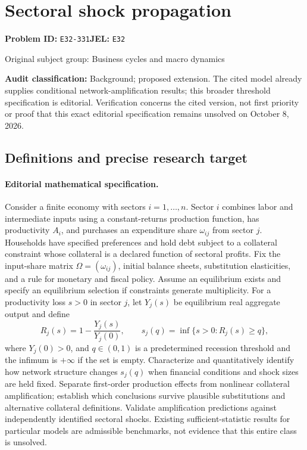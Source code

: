 \documentclass[11pt,a4paper]{article}
\begin{document}
\section*{Sectoral shock propagation}
\textbf{Problem ID:} \texttt{E32-331}\quad \textbf{JEL:} \texttt{E32}\par
\label{problem:OP-0232}
{\sffamily\small\color{muted}Original subject group: Business cycles and macro dynamics\par}
\label{definitions:problem:30007513}
\textbf{Audit classification:} Background; proposed extension. The cited model already supplies conditional network-amplification results; this broader threshold specification is editorial. Verification concerns the cited version, not first priority or proof that this exact editorial specification remains unsolved on October 8, 2026.
\subsection*{Definitions and precise research target}
\paragraph{Editorial mathematical specification.} Consider a finite economy with sectors \(i=1,\ldots,n\). Sector \(i\) combines labor and intermediate inputs using a constant-returns production function, has productivity \(A_i\), and purchases an expenditure share \(\omega_{ij}\) from sector \(j\). Households have specified preferences and hold debt subject to a collateral constraint whose collateral is a declared function of sectoral profits. Fix the input-share matrix \(\Omega=(\omega_{ij})\), initial balance sheets, substitution elasticities, and a rule for monetary and fiscal policy. Assume an equilibrium exists and specify an equilibrium selection if constraints generate multiplicity.
For a productivity loss \(s>0\) in sector \(j\), let \(Y_j(s)\) be equilibrium real aggregate output and define
\[
R_j(s)=1-\frac{Y_j(s)}{Y_j(0)},\qquad
s_j(q)=\inf\{s>0:R_j(s)\ge q\},
\]
where \(Y_j(0)>0\), and \(q\in(0,1)\) is a predetermined recession threshold and the infimum is \(+\infty\) if the set is empty. Characterize and quantitatively identify how network structure changes \(s_j(q)\) when financial conditions and shock sizes are held fixed. Separate first-order production effects from nonlinear collateral amplification; establish which conclusions survive plausible substitutions and alternative collateral definitions. Validate amplification predictions against independently identified sectoral shocks. Existing sufficient-statistic results for particular models are admissible benchmarks, not evidence that this entire class is unsolved.
\end{document}

